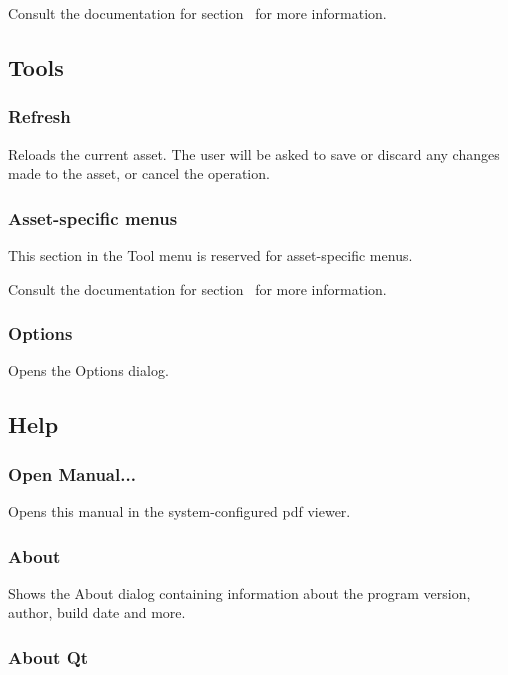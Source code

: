 \documentclass[10pt, a4paper, titlepage, oneside]{article}
\begin{document}
Consult the documentation for section~ for more information.

\subsection{Tools}

\subsubsection{Refresh}

Reloads the current asset. The user will be asked to save or discard any changes made to the asset, or cancel the operation.

\subsubsection{Asset-specific menus}

This section in the Tool menu is reserved for asset-specific menus.

Consult the documentation for section~ for more information.

\subsubsection{Options}

Opens the Options dialog.

\subsection{Help}

\subsubsection{Open Manual...}

Opens this manual in the system-configured pdf viewer.

\subsubsection{About}

Shows the About dialog containing information about the program version, author, build date and more.

\subsubsection{About Qt}
\end{document}
